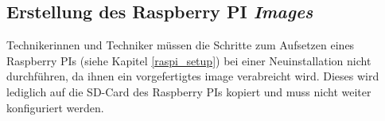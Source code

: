\subsection{Erstellung des Raspberry PI \textit{Images}}
Technikerinnen und Techniker müssen die Schritte zum Aufsetzen eines Raspberry PIs (siehe Kapitel \ref{raspi_setup}) bei einer Neuinstallation nicht durchführen, da ihnen ein vorgefertigtes \gls{image} verabreicht wird. Dieses wird lediglich auf die SD-Card des Raspberry PIs kopiert und muss nicht weiter konfiguriert werden.